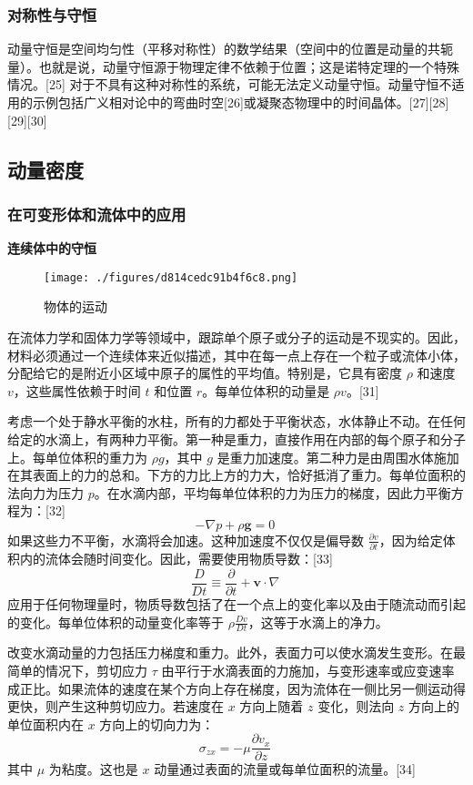\subsubsection{对称性与守恒}
动量守恒是空间均匀性（平移对称性）的数学结果（空间中的位置是动量的共轭量）。也就是说，动量守恒源于物理定律不依赖于位置；这是诺特定理的一个特殊情况。[25] 对于不具有这种对称性的系统，可能无法定义动量守恒。动量守恒不适用的示例包括广义相对论中的弯曲时空[26]或凝聚态物理中的时间晶体。[27][28][29][30]
\subsection{动量密度}
\subsubsection{在可变形体和流体中的应用}
\textbf{连续体中的守恒}\\
\begin{figure}[ht]
\centering
\texttt{[image: ./figures/d814cedc91b4f6c8.png]}
\caption{物体的运动} \label{fig_DL_4}
\end{figure}
在流体力学和固体力学等领域中，跟踪单个原子或分子的运动是不现实的。因此，材料必须通过一个连续体来近似描述，其中在每一点上存在一个粒子或流体小体，分配给它的是附近小区域中原子的属性的平均值。特别是，它具有密度 \(\rho\) 和速度 \(v\)，这些属性依赖于时间 \(t\) 和位置 \(r\)。每单位体积的动量是 \(\rho v\)。[31]

考虑一个处于静水平衡的水柱，所有的力都处于平衡状态，水体静止不动。在任何给定的水滴上，有两种力平衡。第一种是重力，直接作用在内部的每个原子和分子上。每单位体积的重力为 \(\rho g\)，其中 \(g\) 是重力加速度。第二种力是由周围水体施加在其表面上的力的总和。下方的力比上方的力大，恰好抵消了重力。每单位面积的法向力为压力 \(p\)。在水滴内部，平均每单位体积的力为压力的梯度，因此力平衡方程为：[32]
\[
-\nabla p + \rho \mathbf{g} = 0~
\]
如果这些力不平衡，水滴将会加速。这种加速度不仅仅是偏导数 \(\frac{\partial v}{\partial t}\)，因为给定体积内的流体会随时间变化。因此，需要使用物质导数：[33]
\[
\frac{D}{Dt} \equiv \frac{\partial}{\partial t} + \mathbf{v} \cdot \nabla~
\]
应用于任何物理量时，物质导数包括了在一个点上的变化率以及由于随流动而引起的变化。每单位体积的动量变化率等于 \(\rho \frac{Dv}{Dt}\)，这等于水滴上的净力。

改变水滴动量的力包括压力梯度和重力。此外，表面力可以使水滴发生变形。在最简单的情况下，剪切应力 \(\tau\) 由平行于水滴表面的力施加，与变形速率或应变速率成正比。如果流体的速度在某个方向上存在梯度，因为流体在一侧比另一侧运动得更快，则产生这种剪切应力。若速度在 \(x\) 方向上随着 \(z\) 变化，则法向 \(z\) 方向上的单位面积内在 \(x\) 方向上的切向力为：
\[
\sigma_{zx} = -\mu \frac{\partial v_x}{\partial z}~
\]
其中 \(\mu\) 为粘度。这也是 \(x\) 动量通过表面的流量或每单位面积的流量。[34]

